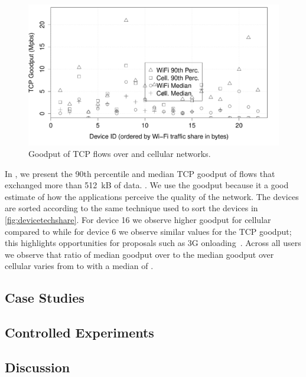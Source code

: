 \begin{figure}
\includegraphics[width=\columnwidth]{plots/deviceTechDataRate.pdf}
\caption{Goodput of TCP flows over \wifi and cellular networks.}
\label{fig:devicetechrate}
\end{figure}

In , we present the 90th percentile and median TCP goodput of flows that exchanged more than 512~kB of data.
.
We use the goodput because it a good estimate of how the applications perceive the quality of the network.  
The devices are sorted according to the same technique used to sort the devices in \ref{fig:devicetechshare}.
For device 16 we observe higher goodput for cellular compared to \wifi while for device 6 we observe similar values for the 
TCP goodput; this highlights opportunities for proposals such as 3G onloading~\cite{vr:3gol}.
Across all users we observe that ratio of median goodput over \wifi to the median goodput over cellular varies from \tbdv{ } to \tbdv{ } with a median of \tbdv{}.



\subsection{Case Studies}


\subsection{Controlled Experiments}

\subsection{Discussion}





